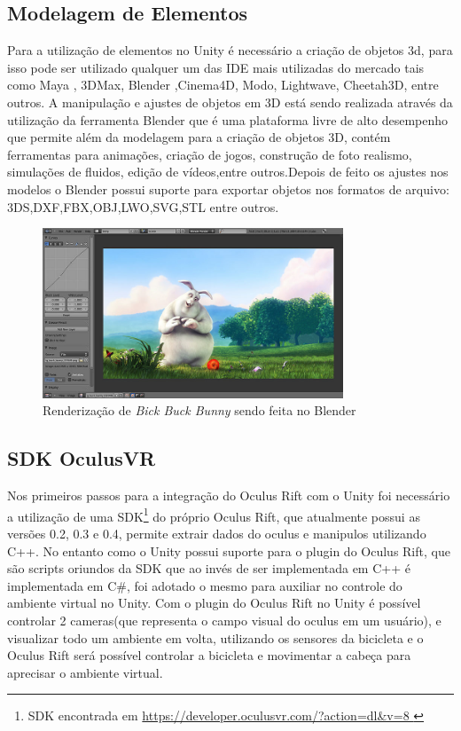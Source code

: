 \subsection{Modelagem de Elementos} %
\label{sub:modelagem}
	Para a utilização de elementos no Unity é necessário a criação de objetos 3d, para isso pode ser utilizado qualquer um das IDE mais utilizadas do mercado tais como Maya , 3DMax, Blender ,Cinema4D, Modo, Lightwave, Cheetah3D, entre outros. A manipulação e ajustes de objetos em 3D está sendo realizada através da utilização da ferramenta Blender  que é uma plataforma livre de alto desempenho que permite além da modelagem para a criação de objetos 3D, contém ferramentas para animações, criação de jogos, construção de foto realismo, simulações de fluidos, edição de vídeos,entre outros.Depois de feito os ajustes nos modelos o Blender possui suporte para exportar objetos nos formatos de arquivo: 3DS,DXF,FBX,OBJ,LWO,SVG,STL entre outros.

\begin{figure}[h]
  \centering
  \includegraphics[width=0.8\textwidth]
      {figuras/blender.png}
  \caption{Renderização de \textit{Bick Buck Bunny} sendo feita no Blender}
  \label{coordenadas-rift}
\end{figure}

\subsection{SDK OculusVR}
\label{sub:sdk_ovr}
      Nos primeiros passos para a integração do Oculus Rift com o Unity foi necessário a utilização de uma SDK\footnote{ SDK encontrada em \url{https://developer.oculusvr.com/?action=dl&v=8 }} do próprio Oculus Rift, que atualmente possui as versões 0.2, 0.3 e 0.4, permite extrair dados do oculus e manipulos utilizando C++. No entanto como o Unity possui suporte para o plugin do Oculus Rift, que são scripts oriundos da SDK que ao invés de ser implementada em C++ é implementada em C\#, foi adotado o mesmo para auxiliar no controle do ambiente virtual no Unity.
     Com o plugin do Oculus Rift no Unity é possível controlar 2 cameras(que representa o campo visual do oculus em um usuário), e visualizar todo um ambiente em volta, utilizando os sensores da bicicleta e o Oculus Rift será possível controlar a bicicleta e movimentar a cabeça para aprecisar o ambiente virtual.

